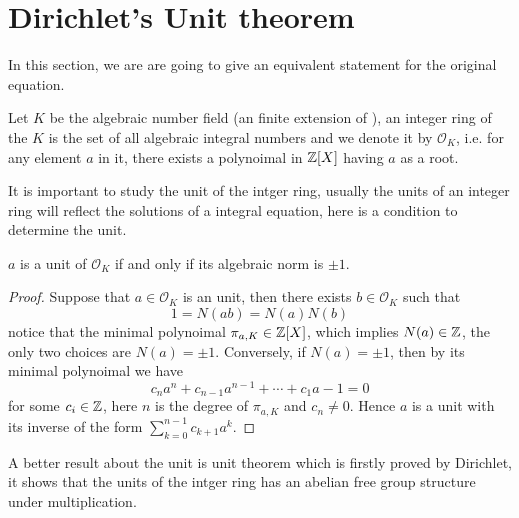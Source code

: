 \section{Dirichlet's Unit theorem}
In this section, we are are going to give an equivalent statement for the original equation.

\begin{definition}
    Let \(K\) be the algebraic number field (an finite extension of \qq), an integer ring of the \(K\) is the set of all algebraic integral numbers and we denote it by \(\mathcal{O}_K\), i.e. for any element \(a\) in it, there exists a polynoimal in \(\mathbb{Z}[X]\) having \(a\) as a root.
\end{definition}

It is important to study the unit of the intger ring, usually the units of an integer ring will reflect the solutions of a integral equation, here is a condition to determine the unit.

\begin{lemma} \label{unit iff norm 1}
    \(a\) is a unit of \(\mathcal{O}_K\) if and only if its algebraic norm is \(\pm 1\).

    \begin{proof}
        Suppose that \(a \in \mathcal{O}_K\) is an unit, then there exists \(b \in \mathcal{O}_K\) such that
        \[1 = N(ab) = N(a)N(b)\]
        notice that the minimal polynoimal \(\pi_{a,K} \in \mathbb{Z}[X]\), which implies \(N(a) \in \mathbb{Z}\), the only two choices are \(N(a) = \pm 1\). Conversely, if \(N(a) = \pm 1\), then by its minimal polynoimal we have
        \[c_na^n+c_{n-1}a^{n-1}+\cdots + c_1a-1 = 0\]
        for some \(c_i \in \mathbb{Z}\), here \(n\) is the degree of \(\pi_{a,K}\) and \(c_n \neq 0\). Hence \(a\) is a unit with its inverse of the form \(\sum_{k=0}^{n-1}c_{k+1}a^k\).
    \end{proof}
\end{lemma}

A better result about the unit is unit theorem which is firstly proved by Dirichlet, it shows that the units of the intger ring has an abelian free group structure under multiplication.

